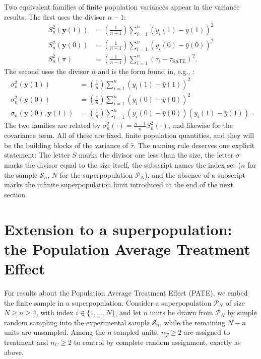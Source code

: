 \documentclass[12pt,leqno]{article}
\theoremstyle{newstyle}
\newcommand{\bZ}{\bm{Z}}   \newcommand{\bz}{\bm{z}}   %
\newcommand{\po}[2]{y_{#1}(#2)}     %
\newcommand{\pov}[1]{\bm{y}(#1)}    %
\newcommand{\ybar}[1]{\bar{y}(#1)}  %
\newcommand{\tauS}{\tau_{\text{SATE}}}
\newcommand{\tauhat}{\hat{\tau}}
\newcommand{\Ssq}[2][n]{S_{#1}^{2}(#2)}
\newcommand{\ssq}[2][n]{\sigma_{#1}^{2}(#2)}
\newcommand{\scov}[2][n]{\sigma_{#1}(#2)}
\begin{document}
Two equivalent families of finite population variances appear in the variance results. The first uses the divisor $n - 1$:
\begin{align*}
\Ssq{\pov{1}} & = \left(\frac{1}{n - 1}\right)\sum \limits_{i = 1}^n \left(\po{i}{1} - \ybar{1}\right)^2 \\
\Ssq{\pov{0}} & = \left(\frac{1}{n - 1}\right)\sum \limits_{i = 1}^n \left(\po{i}{0} - \ybar{0}\right)^2 \\
\Ssq{\bm{\tau}} & = \left(\frac{1}{n - 1}\right)\sum \limits_{i = 1}^n \left(\tau_{i} - \tauS\right)^2.
\end{align*}
The second uses the divisor $n$ and is the form found in, e.g., \citet[][Equation 3.4]{gerbergreen2012}:
\begin{align*}
\ssq{\pov{1}} & = \left(\frac{1}{n}\right)\sum \limits_{i = 1}^n \left(\po{i}{1} - \ybar{1}\right)^2 \\
\ssq{\pov{0}} & = \left(\frac{1}{n}\right)\sum \limits_{i = 1}^n \left(\po{i}{0} - \ybar{0}\right)^2 \\
\scov{\pov{0}, \pov{1}} & = \left(\frac{1}{n}\right)\sum \limits_{i = 1}^n \left(\po{i}{0} - \ybar{0}\right)\left(\po{i}{1} - \ybar{1}\right).
\end{align*}
The two families are related by $\ssq{\cdot} = \frac{n - 1}{n} \Ssq{\cdot}$, and likewise for the covariance term. All of these are fixed, finite population quantities, and they will be the building blocks of the variance of $\tauhat$. The naming rule deserves one explicit statement: The letter $S$ marks the divisor one less than the size, the letter $\sigma$ marks the divisor equal to the size itself, the subscript names the index set ($n$ for the sample $\mathcal{S}_n$, $N$ for the superpopulation $\mathcal{P}_N$), and the absence of a subscript marks the infinite superpopulation limit introduced at the end of the next section.

\section{Extension to a superpopulation: the Population Average Treatment Effect}

For results about the Population Average Treatment Effect (PATE), we embed the finite sample in a superpopulation. Consider a superpopulation $\mathcal{P}_N$ of size $N \geq n \geq 4$, with index $i \in \{1, \ldots , N\}$, and let $n$ units be drawn from $\mathcal{P}_N$ by simple random sampling into the experimental sample $\mathcal{S}_n$, while the remaining $N - n$ units are unsampled. Among the $n$ sampled units, $n_T \geq 2$ are assigned to treatment and $n_C \geq 2$ to control by complete random assignment, exactly as above.
\end{document}
